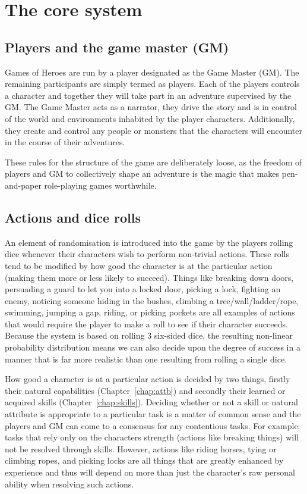 \documentclass[a4paper,10pt,oneside]{book}
\begin{document}
\section{The core system}
\label{sec:base}

\subsection{Players and the game master (GM)}
Games of Heroes are run by a player designated as the Game Master (GM). The remaining participants are simply termed as players. Each of the players controls a character and together they will take part in an adventure supervised by the GM. The Game Master acts as a narrator, they drive the story and is in control of the world and environments inhabited by the player characters. Additionally, they create and control any people or monsters that the characters will encounter in the course of their adventures. 

These rules for the structure of the game are deliberately loose, as the freedom of players and GM to collectively shape an adventure is the magic that makes pen-and-paper role-playing games worthwhile.

\subsection{Actions and dice rolls}
An element of randomisation is introduced into the game by the players rolling dice whenever their characters wish to perform non-trivial actions. These rolls tend to be modified by how good the character is at the particular action (making them more or less likely to succeed). Things like breaking down doors, persuading a guard to let you into a locked door, picking a lock, fighting an enemy, noticing someone hiding in the bushes, climbing a tree/wall/ladder/rope, swimming, jumping a gap, riding, or picking pockets are all examples of actions that would require the player to make a roll to see if their character succeeds. Because the system is based on rolling 3 six-sided dice, the resulting non-linear probability distribution means we can also decide upon the degree of success in a manner that is far more realistic than one resulting from rolling a single dice. 

How good a character is at a particular action is decided by two things, firstly their natural capabilities (Chapter~\ref{chap:attb}) and secondly their learned or acquired skills (Chapter~\ref{chap:skills}). Deciding whether or not a skill or natural attribute is appropriate to a particular task is a matter of common sense and the players and GM can come to a consensus for any contentious tasks. For example: tasks that rely only on the characters strength (actions like breaking things) will not be resolved through skills. However, actions like riding horses, tying or climbing ropes, and picking locks are all things that are greatly enhanced by experience and thus will depend on more than just the character's raw personal ability when resolving such actions.  
\end{document}

